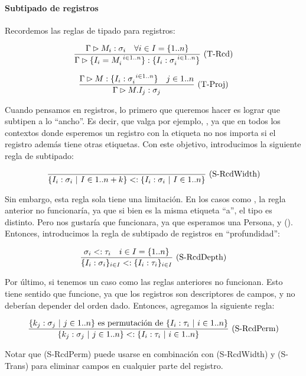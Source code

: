 \paragraph{Subtipado de registros}

Recordemos las reglas de tipado para registros:

\[\frac{\Gamma \rhd M_i : \sigma_i\quad \forall i \in I = \{1..n\}}{\Gamma \rhd \{I_i = M_i^{\ i \in 1..n}\}:\{I_i : \sigma_i^{\ i \in 1..n}\}}\ \text{(T-Rcd)}\]

\[\frac{\Gamma \rhd M : \{I_i : \sigma_{i}^{\ i \in 1..n}\}\quad j\in 1..n}{\Gamma \rhd M.I_j : \sigma_j}\ \text{(T-Proj)}\]

Cuando pensamos en registros, lo primero que queremos hacer es lograr que subtipen a lo ``ancho''. Es decir, que valga por ejemplo, , ya que en todos los contextos donde esperemos un registro con la etiqueta  no nos importa si el registro además tiene otras etiquetas. Con este objetivo, introducimos la siguiente regla de subtipado:

\[\frac{}{\{I_i : \sigma_i \ |\  I \in 1..n + k\} <: \{I_i:\sigma_i \ |\  I \in 1..n\}}\ \text{(S-RcdWidth)}\]

Sin embargo, esta regla sola tiene una limitación. En los casos como , la regla anterior no funcionaría, ya que si bien es la misma etiqueta ``a'', el tipo es distinto. Pero nos gustaría que funcionara, ya que esperamos una Persona, y  (). Entonces, introducimos la regla de subtipado de registros en ``profundidad'':

\[\frac{\sigma_i <: \tau_i\quad i\in I = \{1..n\}}{\{I_i : \sigma_i\}_{i\in I} <: \{I_i : \tau_i\}_{i\in I}}\ \text{(S-RcdDepth)}\]

Por último, si tenemos un caso como  las reglas anteriores no funcionan. Esto tiene sentido que funcione, ya que los registros son descriptores de campos, y no deberían depender del orden dado. Entonces, agregamos la siguiente regla:

\[\frac{\{k_j : \sigma_j \ |\  j\in 1..n\} \text{ es permutación de } \{I_i : \tau_i \ |\  i \in 1..n\}}{\{k_j : \sigma_j \ |\  j\in 1..n\} <: \{I_i : \tau_i \ |\  i \in 1..n\}}\ \text{(S-RcdPerm)}\]

Notar que (S-RcdPerm) puede usarse en combinación con (S-RcdWidth) y (S-Trans) para eliminar campos en cualquier parte del registro.


